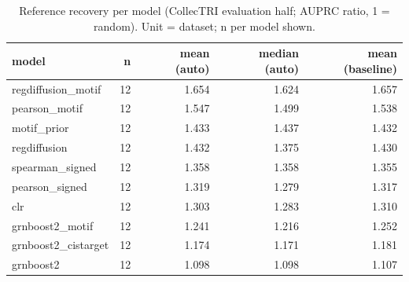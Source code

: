 \begin{table}[H]\centering\small
\caption{Reference recovery per model (CollecTRI evaluation half; AUPRC ratio, 1 = random). Unit = dataset; n per model shown.}
\begin{tabular}{lrrrr}\toprule
model & n & mean (auto) & median (auto) & mean (baseline) \\ \midrule
regdiffusion\_motif & 12 & 1.654 & 1.624 & 1.657 \\
pearson\_motif & 12 & 1.547 & 1.499 & 1.538 \\
motif\_prior & 12 & 1.433 & 1.437 & 1.432 \\
regdiffusion & 12 & 1.432 & 1.375 & 1.430 \\
spearman\_signed & 12 & 1.358 & 1.358 & 1.355 \\
pearson\_signed & 12 & 1.319 & 1.279 & 1.317 \\
clr & 12 & 1.303 & 1.283 & 1.310 \\
grnboost2\_motif & 12 & 1.241 & 1.216 & 1.252 \\
grnboost2\_cistarget & 12 & 1.174 & 1.171 & 1.181 \\
grnboost2 & 12 & 1.098 & 1.098 & 1.107 \\
\bottomrule\end{tabular}\end{table}
